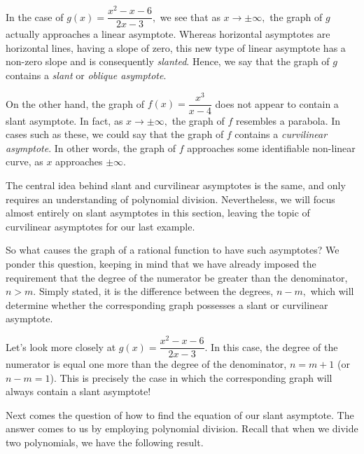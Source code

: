 \documentclass[12pt]{book}
\theoremstyle{definition}
\begin{document}
In the case of $g(x)=\dfrac{x^2-x-6}{2x-3},$ we see that as $x\rightarrow\pm\infty,$ the graph of $g$ actually approaches a linear asymptote.  Whereas horizontal asymptotes are horizontal lines, having a slope of zero, this new type of linear asymptote has a non-zero slope and is consequently {\it slanted}.  Hence, we say that the graph of $g$ contains a {\it slant} or {\it oblique asymptote}.
\par
On the other hand, the graph of $f(x)=\dfrac{x^3}{x-4}$ does not appear to contain a slant asymptote.  In fact, as $x\rightarrow\pm\infty,$ the graph of $f$ resembles a parabola.  In cases such as these, we could say that the graph of $f$ contains a {\it curvilinear asymptote}.  In other words, the graph of $f$ approaches some identifiable non-linear curve, as $x$ approaches $\pm\infty$.
\par 
The central idea behind slant and curvilinear asymptotes is the same, and only requires an understanding of polynomial division.  Nevertheless, we will focus almost entirely on slant asymptotes in this section, leaving the topic of curvilinear asymptotes for our last example.
\par
So what causes the graph of a rational function to have such asymptotes?  We ponder this question, keeping in mind that we have already imposed the requirement that the degree of the numerator be greater than the denominator, $n>m$.  Simply stated, it is the difference between the degrees, $n-m,$ which will determine whether the corresponding graph possesses a slant or curvilinear asymptote.
\par
Let's look more closely at $g(x)=\dfrac{x^2-x-6}{2x-3}.$  In this case, the degree of the numerator is equal one more than the degree of the denominator, $n=m+1$ (or $n-m=1$).  This is precisely the case in which the corresponding graph will always contain a slant asymptote!
\begin{center}
\end{center}
Next comes the question of how to find the equation of our slant asymptote.  The answer comes to us by employing polynomial division.  Recall that when we divide two polynomials, we have the following result.
\end{document}
